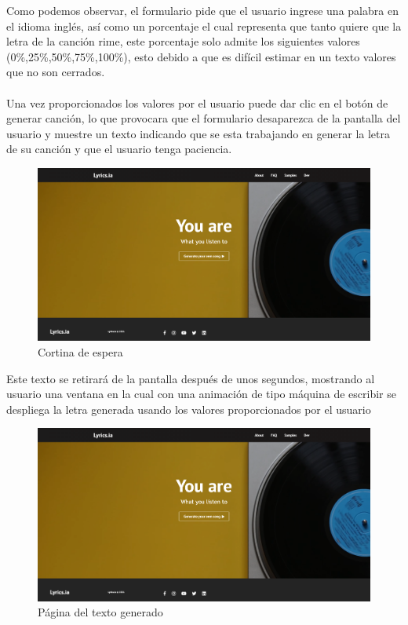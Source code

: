 \documentclass[12pt, a4paper, titlepage]{report}
\begin{document}
	Como podemos observar, el formulario pide que el usuario ingrese una palabra en el idioma inglés, así como un porcentaje el cual representa que tanto quiere que la letra de la canción rime, este porcentaje solo admite los siguientes valores (0\%,25\%,50\%,75\%,100\%), esto debido a que es difícil estimar en un texto valores que no son cerrados.\\\\
	Una vez proporcionados los valores por el usuario puede dar clic en el botón de generar canción, lo que provocara que el formulario desaparezca de la pantalla del usuario y muestre un texto indicando que se esta trabajando en generar la letra de su canción y que el usuario tenga paciencia.
	\begin{figure}[H] 
		\includegraphics[width=13.5cm]{./Imagenes/Capturas/x.png}
		\centering \caption{Cortina de espera}
	\end{figure}
	Este texto se retirará de la pantalla después de unos segundos, mostrando al usuario una ventana en la cual con una animación de tipo máquina de escribir se despliega la letra generada usando los valores proporcionados por el usuario
	\begin{figure}[H] 
		\includegraphics[width=13.5cm]{./Imagenes/Capturas/x.png}
		\centering \caption{Página del texto generado}
	\end{figure}
\end{document}
